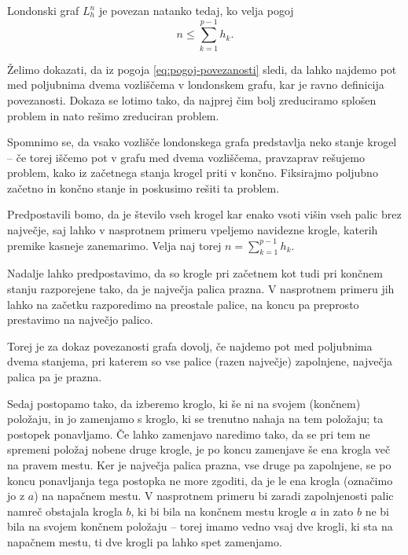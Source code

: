 \documentclass[twoside,11pt]{article}
\begin{document}
\begin{izrek}
    Londonski graf $L_h^n$ je povezan natanko tedaj, ko velja pogoj
    \begin{equation}
    n \leq \sum_{k=1}^{p-1} h_k.
    \label{eq:pogoj-povezanosti}
    \end{equation}
\end{izrek}

\begin{dokaz}
Želimo dokazati, da iz pogoja \eqref{eq:pogoj-povezanosti} sledi, da lahko najdemo pot med poljubnima dvema vozliščema v londonskem grafu, kar je ravno definicija povezanosti. Dokaza se lotimo tako, da najprej čim bolj zreduciramo splošen problem in nato rešimo zreduciran problem.

Spomnimo se, da vsako vozlišče londonskega grafa predstavlja neko stanje krogel -- če torej iščemo pot v grafu med dvema vozliščema, pravzaprav rešujemo problem, kako iz začetnega stanja krogel priti v končno. Fiksirajmo poljubno začetno in končno stanje in poskusimo rešiti ta problem.

Predpostavili bomo, da je število vseh krogel kar enako vsoti višin vseh palic brez največje, saj lahko v nasprotnem primeru vpeljemo navidezne krogle, katerih premike kasneje zanemarimo. Velja naj torej $n = \sum_{k=1}^{p-1}h_k$.

Nadalje lahko predpostavimo, da so krogle pri začetnem kot tudi pri končnem stanju razporejene tako, da je največja palica prazna. V nasprotnem primeru jih lahko na začetku razporedimo na preostale palice, na koncu pa preprosto prestavimo na največjo palico.

Torej je za dokaz povezanosti grafa dovolj, če najdemo pot med poljubnima dvema stanjema, pri katerem so vse palice (razen največje) zapolnjene, največja palica pa je prazna.

Sedaj postopamo tako, da izberemo kroglo, ki še ni na svojem (končnem) položaju, in jo zamenjamo s kroglo, ki se trenutno nahaja na tem položaju; ta postopek ponavljamo. Če lahko zamenjavo naredimo tako, da se pri tem ne spremeni položaj nobene druge krogle, je po koncu zamenjave še ena krogla več na pravem mestu.
Ker je največja palica prazna, vse druge pa zapolnjene, se po koncu ponavljanja tega postopka ne more zgoditi, da je le ena krogla (označimo jo z $a$) na napačnem mestu. V nasprotnem primeru bi zaradi zapolnjenosti palic namreč obstajala krogla $b$, ki bi bila na končnem mestu krogle $a$ in zato $b$ ne bi bila na svojem končnem položaju -- torej imamo vedno vsaj dve krogli, ki sta na napačnem mestu, ti dve krogli pa lahko spet zamenjamo.


\end{dokaz}
\end{document}
